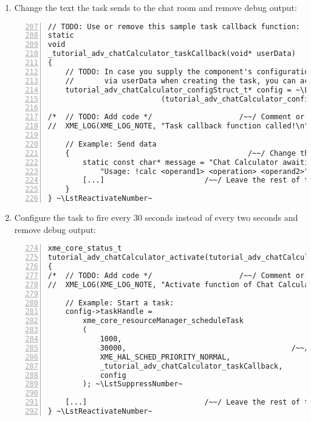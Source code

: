 \begin{enumerate}
\begin{lstlisting}[numbers=left,firstnumber=36]
	// Invalid operation is handled in isOperationValid()
	return 0;
}
\end{lstlisting}

	\item Change the text the task sends to the chat room and remove debug output:

\begin{lstlisting}[numbers=left,firstnumber=207]
// TODO: Use or remove this sample task callback function:
static
void
_tutorial_adv_chatCalculator_taskCallback(void* userData)
{
	// TODO: In case you supply the component's configuration instance
	//       via userData when creating the task, you can access it here:
	tutorial_adv_chatCalculator_configStruct_t* config = ~\LstSuppressNumber~
                          (tutorial_adv_chatCalculator_configStruct_t*)userData; ~\LstReactivateNumber~

/*	// TODO: Add code */                    /~~/ Comment or remove this block
//	XME_LOG(XME_LOG_NOTE, "Task callback function called!\n");

	// Example: Send data
	{                                         /~~/ Change the following lines
		static const char* message = "Chat Calculator awaiting commands.\n"
			"Usage: !calc <operand1> <operation> <operand2>"; ~\LstSuppressNumber~
		[...]                       /~~/ Leave the rest of the function as-is
	}
} ~\LstReactivateNumber~
\end{lstlisting}

	\item Configure the task to fire every 30 seconds instead of every two seconds
		and remove debug output:

\begin{lstlisting}[numbers=left,firstnumber=274]
xme_core_status_t
tutorial_adv_chatCalculator_activate(tutorial_adv_chatCalculator_configStruct_t* config)
{
/*	// TODO: Add code */                    /~~/ Comment or remove this block
//	XME_LOG(XME_LOG_NOTE, "Activate function of Chat Calculator called!\n");

	// Example: Start a task:
	config->taskHandle =
		xme_core_resourceManager_scheduleTask
		(
			1000,
			30000,                                      /~~/ Change this line
			XME_HAL_SCHED_PRIORITY_NORMAL,
			_tutorial_adv_chatCalculator_taskCallback,
			config
		); ~\LstSuppressNumber~

	[...]                           /~~/ Leave the rest of the function as-is
} ~\LstReactivateNumber~
\end{lstlisting}


\end{enumerate}
